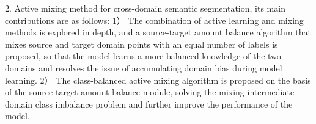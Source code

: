 2. Active mixing method for cross-domain semantic segmentation, its main contributions are as follows:
 1） The combination of active learning and mixing methods is explored in depth, and a source-target amount balance algorithm that mixes source and target domain points with an equal number of labels is proposed, so that the model learns a more balanced knowledge of the two domains and resolves the issue of accumulating domain bias during model learning.
2） The class-balanced active mixing algorithm is proposed on the basis of the source-target amount balance module, solving the mixing intermediate domain class imbalance problem and further improve the performance of the model.

